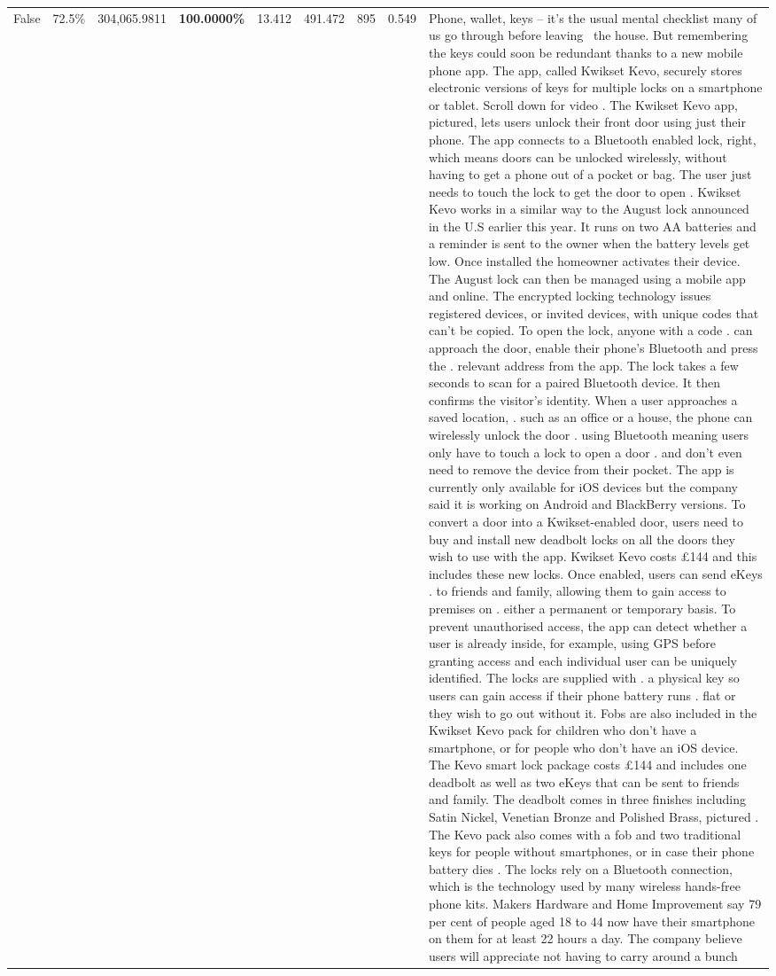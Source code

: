 \begin{table}[H]
\begin{tabular}{lllrlllll}
False & 72.5\% & 304,065.9811 & \bfseries \color{red} 100.0000\% & 13.412 & 491.472 & 895 & 0.549 & Phone, wallet, keys – it’s the usual mental checklist many of us go through before leaving  the house. But remembering the keys could soon be redundant thanks to a new mobile phone app. The app, called Kwikset Kevo, securely stores electronic versions of keys for multiple locks on a smartphone or tablet. Scroll down for video . The Kwikset Kevo app, pictured, lets users unlock their front door using just their phone. The app connects to a Bluetooth enabled lock, right, which means doors can be unlocked wirelessly, without having to get a phone out of a pocket or bag. The user just needs to touch the lock to get the door to open . Kwikset Kevo works in a similar way to the August lock announced in the U.S earlier this year. It runs on two AA batteries and a reminder is sent to the owner when the battery levels get low. Once installed the homeowner activates their device. The August lock can then be managed using a mobile app and online. The encrypted locking technology issues registered devices, or invited devices, with unique codes that can't be copied. To open the lock, anyone with a code . can approach the door, enable their phone's Bluetooth and press the . relevant address from the app. The lock takes a few seconds to scan for a paired Bluetooth device. It then confirms the visitor's identity. When a user approaches a saved location, . such as an office or a house, the phone can wirelessly unlock the door . using Bluetooth meaning users only have to touch a lock to open a door . and don't even need to remove the device from their pocket. The app is currently only available for iOS devices but the company said it is working on Android and BlackBerry versions. To convert a door into a Kwikset-enabled door, users need to buy and install new deadbolt locks on all the doors they wish to use with the app. Kwikset Kevo costs £144 and this includes these new locks. Once enabled, users can send eKeys . to friends and family, allowing them to gain access to premises on . either a permanent or temporary basis. To prevent unauthorised access, the app can detect whether a user is already inside, for example, using GPS before granting access and each individual user can be uniquely identified. The locks are supplied with . a physical key so users can gain access if their phone battery runs . flat or they wish to go out without it. Fobs are also included in the Kwikset Kevo pack for children who don't have a smartphone, or for people who don't have an iOS device. The Kevo smart lock package costs £144 and includes one deadbolt as well as two eKeys that can be sent to friends and family. The deadbolt comes in three finishes including Satin Nickel, Venetian Bronze and Polished Brass, pictured . The Kevo pack also comes with a fob and two traditional keys for people without smartphones, or in case their phone battery dies . The locks rely on a Bluetooth connection, which is the technology used by many wireless hands-free phone kits. Makers Hardware and Home Improvement say 79 per cent of people aged 18 to 44 now have their smartphone on them for at least 22 hours a day. The company believe users will appreciate not having to carry around a bunch 
\end{tabular}
\end{table}
